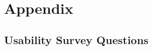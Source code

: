 \documentclass[12pt, titlepage]{article}
\begin{document}
					
					
					
					
					

					
					
					
					





				




\newpage

\section{Appendix}

\subsection{Usability Survey Questions}
\end{document}
